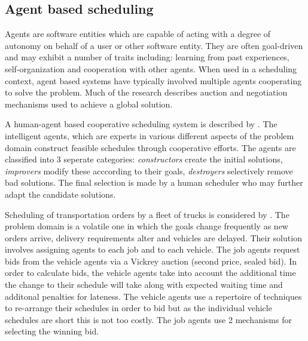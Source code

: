 








%
%
\subsection{Agent based scheduling}
\label{sub:review_agent}
Agents are software entities which are capable of acting with a degree of autonomy on behalf of a user or other software entity. They are often goal-driven and may exhibit a number of traits including: learning from past experiences, self-organization and cooperation with other agents. When used in a scheduling context, agent based systems have typically involved multiple agents cooperating to solve the problem. Much of the research describes auction and negotiation mechanisms used to achieve a global solution. 

A human-agent based cooperative scheduling system is described by \citet{murthy97agent}. The intelligent agents, which are experts in various different aspects of the problem domain construct feasible schedules through cooperative efforts. The agents are classified into 3 seperate categories: \emph{constructors} create the initial solutions, \emph{improvers} modify these acccording to their goals, \emph{destroyers} selectively remove bad solutions. The final selection is made by a human scheduler who may further adapt the candidate solutions. 


Scheduling of transportation orders by a fleet of trucks is considered by \citet{mes07comparison}. The problem domain is a volatile one in which the goals change frequently as new orders arrive, delivery requirements alter and vehicles are delayed. Their solution involves assigning agents to each job and to each vehicle. The job agents request bids from the vehicle agents via a Vickrey auction (second price, sealed bid). 
In order to calculate bids, the vehicle agents take into account the additional time the change to their schedule will take along with expected waiting time and additonal penalties for lateness. The vehicle agents use a repertoire of techniques to re-arrange their schedules in order to bid but as the individual vehicle schedules are short this is not too costly. The job agents use 2 mechanisms for selecting the winning bid. 

